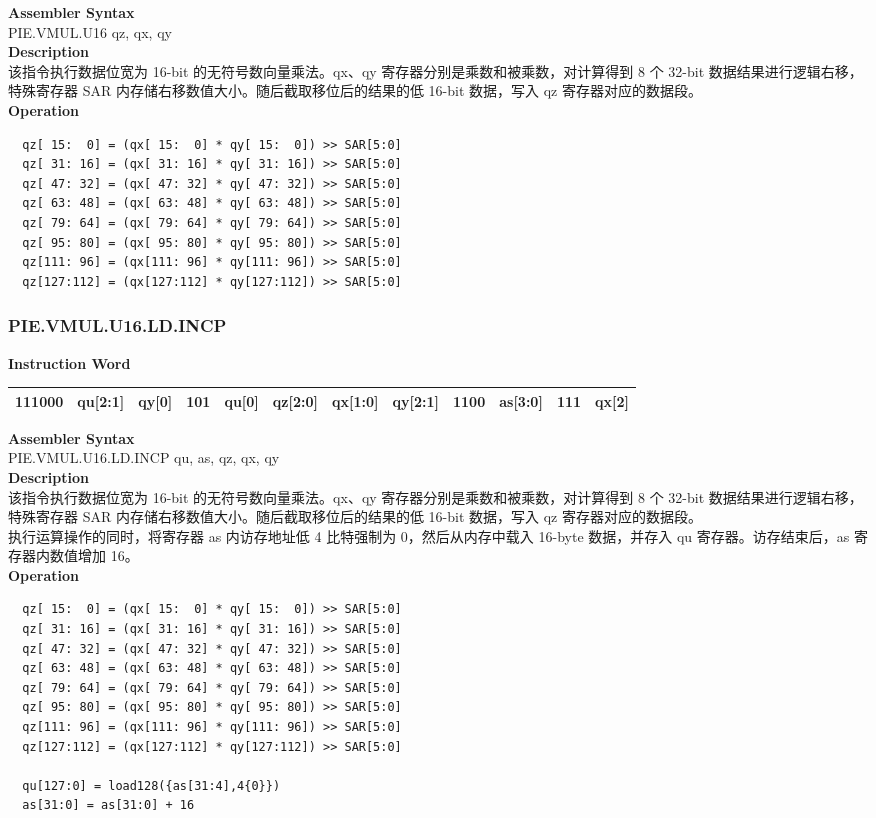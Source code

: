 \textbf{Assembler Syntax} \\
PIE.VMUL.U16 qz, qx, qy \\
\textbf{Description} \\
该指令执行数据位宽为 16-bit 的无符号数向量乘法。qx、qy 寄存器分别是乘数和被乘数，对计算得到 8 个 32-bit 数据结果进行逻辑右移，特殊寄存器 SAR 内存储右移数值大小。随后截取移位后的结果的低 16-bit 数据，写入 qz 寄存器对应的数据段。\\
\textbf{Operation}
\begin{lstlisting}
  qz[ 15:  0] = (qx[ 15:  0] * qy[ 15:  0]) >> SAR[5:0]
  qz[ 31: 16] = (qx[ 31: 16] * qy[ 31: 16]) >> SAR[5:0]
  qz[ 47: 32] = (qx[ 47: 32] * qy[ 47: 32]) >> SAR[5:0]
  qz[ 63: 48] = (qx[ 63: 48] * qy[ 63: 48]) >> SAR[5:0]
  qz[ 79: 64] = (qx[ 79: 64] * qy[ 79: 64]) >> SAR[5:0]
  qz[ 95: 80] = (qx[ 95: 80] * qy[ 95: 80]) >> SAR[5:0]
  qz[111: 96] = (qx[111: 96] * qy[111: 96]) >> SAR[5:0]
  qz[127:112] = (qx[127:112] * qy[127:112]) >> SAR[5:0]
\end{lstlisting}

\newpage
\subsubsection{PIE.VMUL.U16.LD.INCP}\label{instruction:PIEVMULU16LDINCP}
\setlength\tabcolsep{6pt}
\textbf{Instruction Word} \\
\begin{tabular}{|c|c|c|c|c|c|c|c|c|c|c|c|}
	\hline
	111000 & qu[2:1] & qy[0] & 101 & qu[0] & qz[2:0] & qx[1:0] & qy[2:1] & 1100 & as[3:0] & 111 & qx[2] \\
	\hline
\end{tabular}

\textbf{Assembler Syntax} \\
PIE.VMUL.U16.LD.INCP qu, as, qz, qx, qy \\
\textbf{Description} \\
该指令执行数据位宽为 16-bit 的无符号数向量乘法。qx、qy 寄存器分别是乘数和被乘数，对计算得到 8 个 32-bit 数据结果进行逻辑右移，特殊寄存器 SAR 内存储右移数值大小。随后截取移位后的结果的低 16-bit 数据，写入 qz 寄存器对应的数据段。\\ 执行运算操作的同时，将寄存器 as 内访存地址低 4 比特强制为 0，然后从内存中载入 16-byte 数据，并存入 qu 寄存器。访存结束后，as 寄存器内数值增加 16。\\
\textbf{Operation}
\begin{lstlisting}
  qz[ 15:  0] = (qx[ 15:  0] * qy[ 15:  0]) >> SAR[5:0]
  qz[ 31: 16] = (qx[ 31: 16] * qy[ 31: 16]) >> SAR[5:0]
  qz[ 47: 32] = (qx[ 47: 32] * qy[ 47: 32]) >> SAR[5:0]
  qz[ 63: 48] = (qx[ 63: 48] * qy[ 63: 48]) >> SAR[5:0]
  qz[ 79: 64] = (qx[ 79: 64] * qy[ 79: 64]) >> SAR[5:0]
  qz[ 95: 80] = (qx[ 95: 80] * qy[ 95: 80]) >> SAR[5:0]
  qz[111: 96] = (qx[111: 96] * qy[111: 96]) >> SAR[5:0]
  qz[127:112] = (qx[127:112] * qy[127:112]) >> SAR[5:0]

  qu[127:0] = load128({as[31:4],4{0}})
  as[31:0] = as[31:0] + 16
\end{lstlisting}

